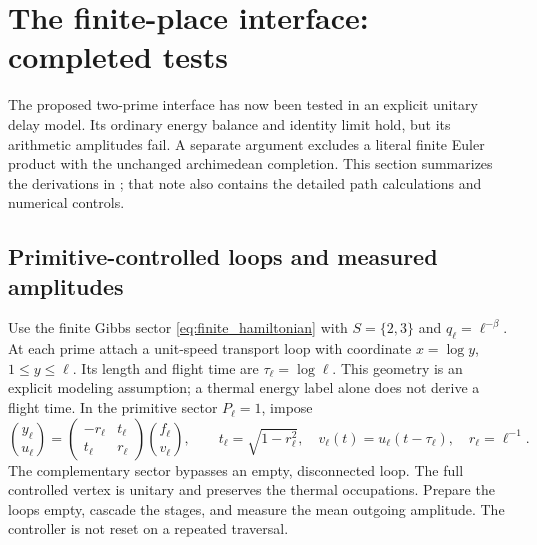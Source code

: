 \section{The finite-place interface: completed tests}
\label{sec:interface}

The proposed two-prime interface has now been tested in an explicit
unitary delay model. Its ordinary energy balance and identity limit
hold, but its arithmetic amplitudes fail. A separate argument excludes
a literal finite Euler product with the unchanged archimedean completion.
This section summarizes the derivations in \cite{InterfaceNote}; that
note also contains the detailed path calculations and numerical controls.

\subsection{Primitive-controlled loops and measured amplitudes}

Use the finite Gibbs sector \eqref{eq:finite_hamiltonian} with
$S=\{2,3\}$ and $q_\ell=\ell^{-\beta}$. At each prime attach a
unit-speed transport loop with coordinate $x=\log y$, $1\le y\le\ell$.
Its length and flight time are $\tau_\ell=\log\ell$. This geometry is
an explicit modeling assumption; a thermal energy label alone does not
derive a flight time. In the primitive sector $P_\ell=1$, impose
\begin{equation}
 \binom{y_\ell}{u_\ell}
 =\begin{pmatrix}-r_\ell&t_\ell\\t_\ell&r_\ell\end{pmatrix}
   \binom{f_\ell}{v_\ell},\qquad
 t_\ell=\sqrt{1-r_\ell^2},\quad
 v_\ell(t)=u_\ell(t-\tau_\ell),\quad r_\ell=\ell^{-1}.
 \label{eq:loop_vertex}
\end{equation}
The complementary sector bypasses an empty, disconnected loop. The
full controlled vertex is unitary and preserves the thermal occupations.
Prepare the loops empty, cascade the stages, and measure the mean
outgoing amplitude. The controller is not reset on a repeated traversal.

